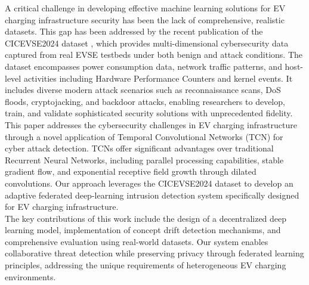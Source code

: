 A critical challenge in developing effective machine learning solutions for EV charging infrastructure security has been the lack of comprehensive, realistic datasets. This gap has been addressed by the recent publication of the CICEVSE2024 dataset \cite{buedi2024enhancing}, which provides multi-dimensional cybersecurity data captured from real EVSE testbeds under both benign and attack conditions. The dataset encompasses power consumption data, network traffic patterns, and host-level activities including Hardware Performance Counters and kernel events. It includes diverse modern attack scenarios such as reconnaissance scans, DoS floods, cryptojacking, and backdoor attacks, enabling researchers to develop, train, and validate sophisticated security solutions with unprecedented fidelity. \\

This paper addresses the cybersecurity challenges in EV charging infrastructure through a novel application of Temporal Convolutional Networks (TCN) for cyber attack detection. TCNs offer significant advantages over traditional Recurrent Neural Networks, including parallel processing capabilities, stable gradient flow, and exponential receptive field growth through dilated convolutions. Our approach leverages the CICEVSE2024 dataset to develop an adaptive federated deep-learning intrusion detection system specifically designed for EV charging infrastructure. \\

The key contributions of this work include the design of a decentralized deep learning model, implementation of concept drift detection mechanisms, and comprehensive evaluation using real-world datasets. Our system enables collaborative threat detection while preserving privacy through federated learning principles, addressing the unique requirements of heterogeneous EV charging environments.


